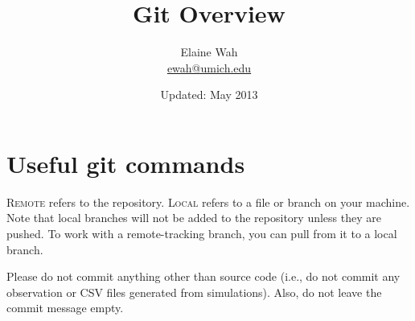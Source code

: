 \documentclass[11pt]{article}
\begin{document}
	
\title{Git Overview}
\author{
Elaine Wah\\
\href{mailto:ewah@umich.edu}{ewah@umich.edu}
}
\date{Updated: May 2013}
\maketitle


\section{Useful git commands}

\textsc{Remote} refers to the repository. \textsc{Local} refers to a file or branch on your machine. Note that local branches will not be added to the repository unless they are pushed. To work with a remote-tracking branch, you can pull from it to a local branch.

Please do not commit anything other than source code (i.e., do not commit any observation or CSV files generated from simulations). Also, do not leave the commit message empty.\\
\end{document}
